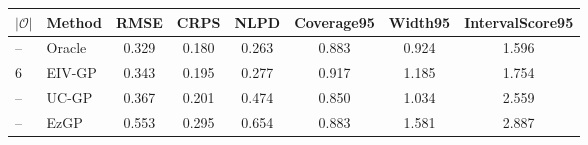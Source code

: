 
\begin{tabular}{llcccccc}
\toprule
$|\mathcal O|$ & Method & RMSE & CRPS & NLPD & Coverage95 & Width95 & IntervalScore95\\
\midrule
-- & Oracle & 0.329 & 0.180 & 0.263 & 0.883 & 0.924 & 1.596\\
6 & EIV-GP & 0.343 & 0.195 & 0.277 & 0.917 & 1.185 & 1.754\\
-- & UC-GP & 0.367 & 0.201 & 0.474 & 0.850 & 1.034 & 2.559\\
-- & EzGP & 0.553 & 0.295 & 0.654 & 0.883 & 1.581 & 2.887\\
\bottomrule
\end{tabular}
